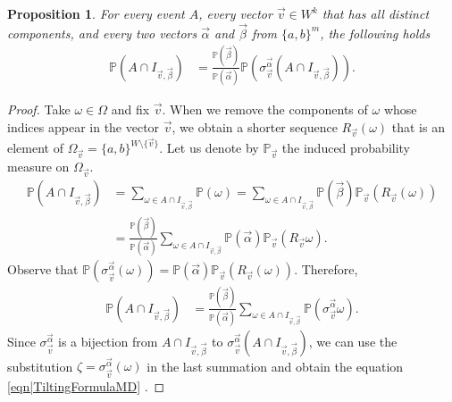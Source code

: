 \documentclass[reqno]{amsart}
\newtheorem{proposition}{Proposition}
\begin{document}
\begin{proposition}\label{thm|TiltingLemmaMD}
For every event $A$, every vector $\overrightarrow v\in W^k$ that has all distinct components, and every two vectors $\overrightarrow\alpha$ and $\overrightarrow \beta$ from $\{a,b\}^m$, the following holds 
\begin{align}
\mathbb P\left(A\cap I_{\overrightarrow v,\overrightarrow\beta} \right)&= \frac{\mathbb P(\overrightarrow\beta)}{\mathbb P\left(\overrightarrow\alpha\right)} \mathbb P\left( 
\sigma_{\overrightarrow v}^{\overrightarrow \alpha}\left(
A\cap I_{\overrightarrow v,\overrightarrow \beta}
\right)\right).
 \label{eqn|TiltingFormulaMD} 
\end{align}
\end{proposition}
\begin{proof}
Take $\omega\in \Omega$ and fix $\overrightarrow v$. When we remove the components of $\omega$ whose indices appear in the vector $\overrightarrow v$, we obtain a shorter sequence $R_{\overrightarrow v}(\omega)$ that is an element of $\Omega_{\overrightarrow v}=\{a,b\}^{W\setminus\{\overrightarrow v\}}$.  
Let us denote by $\mathbb P_{\overrightarrow v}$ the induced probability measure on $\Omega_{\overrightarrow v}$. 
\begin{align*}
 \mathbb P\left(A\cap I_{\overrightarrow v,\overrightarrow\beta} \right)&=\sum_{\omega \in A\cap I_{\overrightarrow v,\overrightarrow\beta} }\mathbb P(\omega)=
\sum_{\omega \in A\cap I_{\overrightarrow v,\overrightarrow\beta} }\mathbb P(\overrightarrow\beta)\mathbb P_{\overrightarrow v}(R_{\overrightarrow v}(\omega)) \\
&=\frac{\mathbb P(\overrightarrow \beta)}{\mathbb P(\overrightarrow\alpha)}\sum_{\omega \in A\cap I_{\overrightarrow v,\overrightarrow\beta}}\mathbb P(\overrightarrow\alpha)\mathbb P_{\overrightarrow v}(R_{\overrightarrow v}\omega).
\end{align*}
Observe  that 
$\mathbb P(\sigma_{\overrightarrow v}^{\overrightarrow\alpha}(\omega))=\mathbb P(\overrightarrow\alpha)\mathbb P_{\overrightarrow v}(R_{\overrightarrow v}(\omega))$. Therefore, 
\begin{align*} 
\mathbb P\left(A\cap I_{\overrightarrow v,\overrightarrow\beta} \right)
&=\frac{\mathbb P(\overrightarrow \beta)}{\mathbb P(\overrightarrow\alpha)}\sum_{\omega \in A\cap I_{\overrightarrow v,\overrightarrow\beta}}\mathbb P(\sigma_{\overrightarrow v}^{\overrightarrow\alpha}\omega).
\end{align*}
Since 
$\sigma_{\overrightarrow v}^{\overrightarrow \alpha}$ is a bijection from $A\cap I_{\overrightarrow v,\overrightarrow\beta}$ to $\sigma_{\overrightarrow v}^{\overrightarrow\alpha}(A\cap I_{\overrightarrow v,\overrightarrow \beta})$, we can use the substitution $\zeta=\sigma_{\overrightarrow v}^{\overrightarrow \alpha}(\omega)$ in the last summation and obtain the equation \eqref{eqn|TiltingFormulaMD} .
\end{proof}
\end{document}
